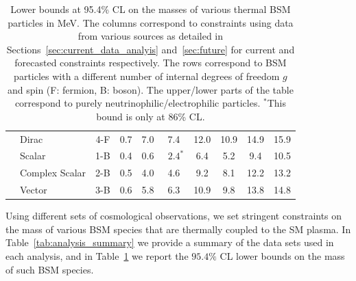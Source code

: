 \documentclass[notitlepage,letterpaper,natbib,aps,prd,onecolumn,amsmath,amsfonts,nofootinbib,preprintnumbers,superscriptaddress,secnumarabic,groupedaddress]{revtex4-1}
\begin{document}
\begin{table}[t]
\begin{center}
{\begin{tabular}{l|lc|ccccc|cc}
&Dirac   & 4-F  &  0.7 & 7.0 & 7.4 & 12.0 & 10.9  & 14.9  & 15.9\\  \cline{2-10} 

&Scalar  & 1-B  & 0.4 & 0.6  & $\>\>2.4^{*}$ & 6.4 & 5.2  & 9.4  & 10.5\\  \cline{2-10} 

&Complex Scalar   & 2-B  &  0.5 & 4.0 &  4.6 & 9.2 & 8.1  & 12.2  & 13.2\\  \cline{2-10} 

&Vector    & 3-B  & 0.6 & 5.8  & 6.3 & 10.9 & 9.8  & 13.8  & 14.8   \\ 
\hline \hline
\end{tabular}
}
\end{center}
\vspace{-0.3cm}
\caption{Lower bounds at 95.4\% CL on the masses of various thermal BSM particles in MeV. The columns correspond to constraints using data from various sources as detailed in Sections~\ref{sec:current_data_analyis} and~\ref{sec:future} for current and forecasted constraints respectively. The rows correspond to BSM particles with a different number of internal degrees of freedom $g$ and spin (F: fermion, B: boson). The upper/lower parts of the table correspond to purely neutrinophilic/electrophilic particles. $^{*}$This bound is only at 86\% CL.}\label{tab:DMbounds}
\end{table}

Using different sets of cosmological observations, we set stringent constraints on the mass of various BSM species that are thermally coupled to the SM plasma. In Table~\ref{tab:analysis_summary} we provide a summary of the data sets used in each analysis, and in Table~\ref{tab:DMbounds} we report the $95.4\%$ CL lower bounds on the mass of such BSM species. 
\end{document}
